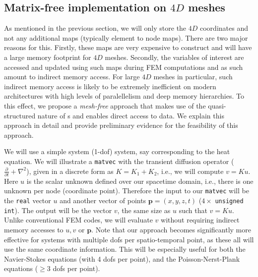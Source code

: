 \subsection{Matrix-free implementation on $4D$ meshes}
\label{s:mvec}

As mentioned in the previous section, we will only store the $4D$ coordinates and not any additional maps (typically element to node maps). There are two major reasons for this. Firstly, these maps are very expensive to construct and will have a large memory footprint for $4D$ meshes. Secondly, the variables of interest are accessed and updated using such maps during FEM computations and as such amount to indirect memory access. For large $4D$ meshes in particular, such indirect memory access is likely to be extremely inefficient on modern architectures with high levels of paralellelism and deep memory hierarchies. To this effect, we propose a {\em mesh-free} approach that makes use of the quasi-structured nature of \stri s and enables direct access to data. We explain this approach in detail and provide preliminary evidence for the feasibility of this approach.  

We will use a simple system (1-dof) system, say corresponding to the heat equation. 
We will illustrate a \texttt{matvec} with the transient diffusion operator ($\frac{\partial}{\partial t} + \nabla^2$), given in a discrete form as $K = K_1+K_2$, i.e., we will compute $v=K u$. Here $u$ is the scalar unknown defined over our spacetime domain, i.e., there is one unknown per node (coordinate point). Therefore the input to our \texttt{matvec} will be the \texttt{real} vector $u$ and another vector of points $\mathbf{p}=(x,y,z,t)$ ($4\times$ \texttt{unsigned int}). The output will be the vector $v$, the same size as $u$ such that $v=K u$. Unlike conventional FEM codes, we will evaluate $v$ without requiring indirect memory accesses to $u,v$ or $\mathbf{p}$. Note that our approach becomes significantly more effective for systems with multiple dofs per spatio-temporal point, as these all will use the same coordinate information. This will be especially useful for both the Navier-Stokes equations (with 4 dofs per point), and the Poisson-Nerst-Plank equations ($\geq 3$ dofs per point).

